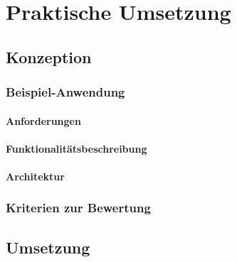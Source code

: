 \part{Praktische Umsetzung} \label{chap:praxis} 

\chapter{Konzeption}

\section{Beispiel-Anwendung}\label{sec:bsp-app} 

\subsection{Anforderungen} %


\subsection{Funktionalitätsbeschreibung}	%

\subsection{Architektur}

\section{Kriterien zur Bewertung}\label{sec:kriterien}

\chapter{Umsetzung} \label{sec:umsetzung}	%

